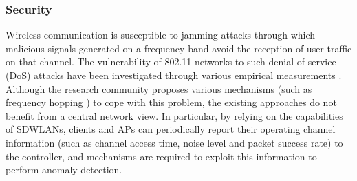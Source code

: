 


\subsubsection{\textbf{Security}}
Wireless communication is susceptible to jamming attacks through which malicious signals generated on a frequency band avoid the reception of user traffic on that channel. 
The vulnerability of 802.11 networks to such denial of service (DoS) attacks have been investigated through various empirical measurements \cite{pelechrinis_denial_2011,bayraktaroglu2008performance,pelechrinis2009ares}.
Although the research community proposes various mechanisms (such as frequency hopping \cite{pelechrinis2010efficacy}) to cope with this problem, the existing approaches do not benefit from a central network view.
In particular, by relying on the capabilities of SDWLANs, clients and APs can periodically report their operating channel information (such as channel access time, noise level and packet success rate) to the controller, and mechanisms are required to exploit this information to perform anomaly detection. 



